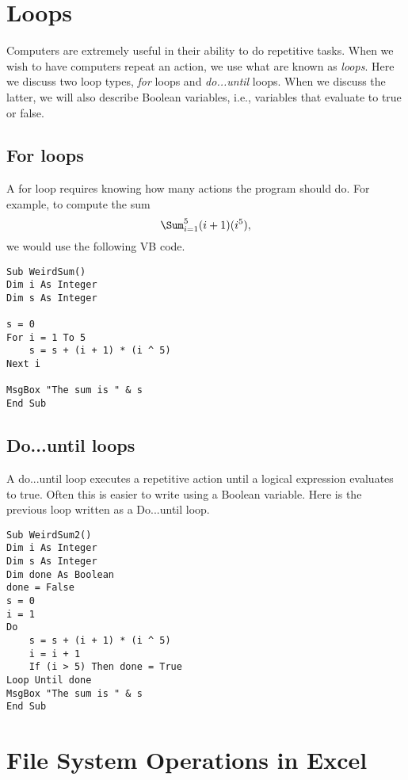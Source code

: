 \documentclass[10pt]{article}
\begin{document}
\section{Loops}
\label{sec:loops}

Computers are extremely useful in their ability to do repetitive
tasks. When we wish to have computers repeat an action, we use what
are known as {\it loops}. Here we discuss two loop types, {\it for}
loops and {\it do...until} loops. When we discuss the latter, we will also
describe Boolean variables, i.e., variables that evaluate to true or false.

\subsection{For loops}
\label{sec:for}
A for loop requires knowing how many actions the program should do.
For example, to compute the sum
\[
\Sum_{i=1}^5 (i+1)(i^5),
\]
we would use the following VB code.
\begin{verbatim}
Sub WeirdSum()
Dim i As Integer
Dim s As Integer

s = 0
For i = 1 To 5
    s = s + (i + 1) * (i ^ 5)
Next i

MsgBox "The sum is " & s
End Sub
\end{verbatim}

\subsection{Do...until loops}
\label{sec:do}
A do...until loop executes a repetitive action until a logical
expression evaluates to true. Often this is easier to write using a
Boolean variable.  Here is the previous loop written as a Do...until loop.
\begin{verbatim}
Sub WeirdSum2()
Dim i As Integer
Dim s As Integer
Dim done As Boolean
done = False
s = 0
i = 1
Do
    s = s + (i + 1) * (i ^ 5)
    i = i + 1
    If (i > 5) Then done = True
Loop Until done
MsgBox "The sum is " & s
End Sub
\end{verbatim}

\section{File System Operations in Excel}
\label{sec:file}
\end{document}

